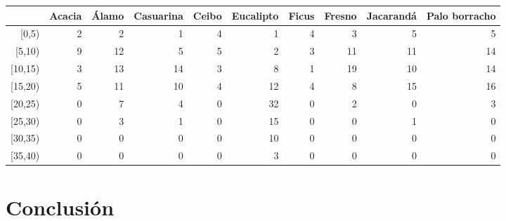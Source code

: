\documentclass[a4paper]{article}
\begin{document}
\begin{center}
  \begin{table}[ht]
    \centering
    \begin{tabular}{rrrrrrrrrr}
      \hline
      & Acacia & Álamo & Casuarina & Ceibo & Eucalipto & Ficus & Fresno & Jacarandá & Palo borracho \\ 
      \hline
      [0,5) &   2 &   2 &   1 &   4 &   1 &   4 &   3 &   5 &   5 \\ 
      [5,10) &   9 &  12 &   5 &   5 &   2 &   3 &  11 &  11 &  14 \\ 
      [10,15) &   3 &  13 &  14 &   3 &   8 &   1 &  19 &  10 &  14 \\ 
      [15,20) &   5 &  11 &  10 &   4 &  12 &   4 &   8 &  15 &  16 \\ 
      [20,25) &   0 &   7 &   4 &   0 &  32 &   0 &   2 &   0 &   3 \\ 
      [25,30) &   0 &   3 &   1 &   0 &  15 &   0 &   0 &   1 &   0 \\ 
      [30,35) &   0 &   0 &   0 &   0 &  10 &   0 &   0 &   0 &   0 \\ 
      [35,40) &   0 &   0 &   0 &   0 &   3 &   0 &   0 &   0 &   0 \\ 
      \hline
    \end{tabular}
  \end{table}
\end{center}


\section{Conclusión}
\end{document}
